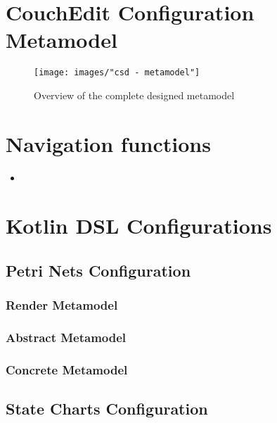 \chapter{CouchEdit Configuration Metamodel}
\begin{sidewaysfigure}
\centering
\texttt{[image: images/"csd - metamodel"]}
\caption{Overview of the complete designed metamodel}
\label{fig:complete-metamodel}
\end{sidewaysfigure}

\chapter{Navigation functions}
\label{app:navigationfunctions}
\begin{itemize}
  \item {}
\end{itemize}


\chapter{Kotlin DSL Configurations}
\section{Petri Nets Configuration}
\label{app:petri}
\subsection*{Render Metamodel}

\subsection*{Abstract Metamodel}

\subsection*{Concrete Metamodel}
\raggedbottom



\section{State Charts Configuration}
\label{app:state}
